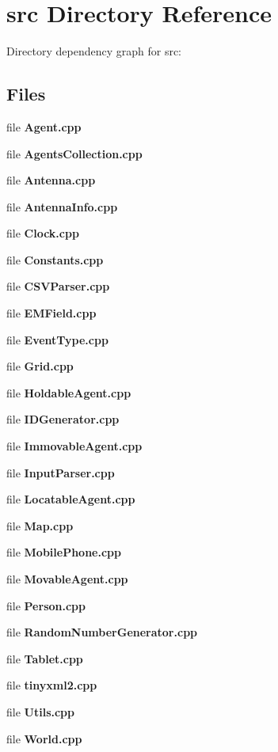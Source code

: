 \section{src Directory Reference}
\label{dir_68267d1309a1af8e8297ef4c3efbcdba}
Directory dependency graph for src\+:
\subsection*{Files}
\begin{DoxyCompactItemize}
\item 
file \textbf{ Agent.\+cpp}
\item 
file \textbf{ Agents\+Collection.\+cpp}
\item 
file \textbf{ Antenna.\+cpp}
\item 
file \textbf{ Antenna\+Info.\+cpp}
\item 
file \textbf{ Clock.\+cpp}
\item 
file \textbf{ Constants.\+cpp}
\item 
file \textbf{ C\+S\+V\+Parser.\+cpp}
\item 
file \textbf{ E\+M\+Field.\+cpp}
\item 
file \textbf{ Event\+Type.\+cpp}
\item 
file \textbf{ Grid.\+cpp}
\item 
file \textbf{ Holdable\+Agent.\+cpp}
\item 
file \textbf{ I\+D\+Generator.\+cpp}
\item 
file \textbf{ Immovable\+Agent.\+cpp}
\item 
file \textbf{ Input\+Parser.\+cpp}
\item 
file \textbf{ Locatable\+Agent.\+cpp}
\item 
file \textbf{ Map.\+cpp}
\item 
file \textbf{ Mobile\+Phone.\+cpp}
\item 
file \textbf{ Movable\+Agent.\+cpp}
\item 
file \textbf{ Person.\+cpp}
\item 
file \textbf{ Random\+Number\+Generator.\+cpp}
\item 
file \textbf{ Tablet.\+cpp}
\item 
file \textbf{ tinyxml2.\+cpp}
\item 
file \textbf{ Utils.\+cpp}
\item 
file \textbf{ World.\+cpp}
\end{DoxyCompactItemize}
